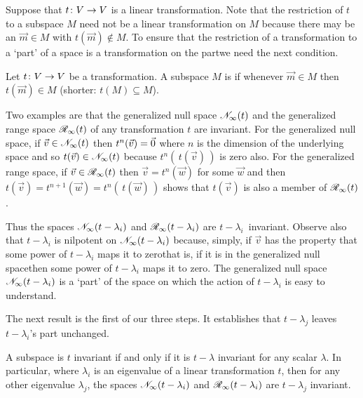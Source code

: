 Suppose that \( \mbox{$t\colon V\to V$} \) is a linear transformation.
Note that the restriction %
of \( t \) to a subspace \( M \) need not be a linear transformation on \( M \)
because there may be an \( \vec{m}\in M \)
with \( t(\vec{m})\not\in M \).
To ensure that the restriction of a transformation 
to a `part' of a space is a transformation on the partwe need the next 
condition. 

\begin{definition} \label{def:invariant}
Let \( \mbox{$t\colon V\to V$} \) be a transformation.
A subspace \( M \) is %
if whenever \( \vec{m}\in M \) then \( t(\vec{m})\in M \)
(shorter: \( t(M)\subseteq M \)).
\end{definition}
 
Two examples are that
the generalized null space $\mathscr{N}_\infty(t)$ and the generalized range space
$\mathscr{R}_\infty(t)$ of any transformation $t$ are invariant.
For the generalized null space, if $\vec{v}\in\mathscr{N}_\infty(t)$ then
$t^n(\vec{v})=\vec{0}$ where $n$ is the dimension of the underlying space
and so $t(\vec{v})\in\mathscr{N}_\infty(t)$ because
$t^n(\,t(\vec{v})\,)$ is zero also.
For the generalized range space, if $\vec{v}\in\mathscr{R}_\infty(t)$ then
$\vec{v}=t^n(\vec{w})$ for some $\vec{w}$ and then 
$t(\vec{v})=t^{n+1}(\vec{w})=t^n(\,t(\vec{w})\,)$ 
shows that $t(\vec{v})$ is also a member of $\mathscr{R}_\infty(t)$.

Thus the spaces $\mathscr{N}_\infty(t-\lambda_i)$ and $\mathscr{R}_\infty(t-\lambda_i)$
are $t-\lambda_i$~invariant.
Observe also that $t-\lambda_i$ is nilpotent on 
$\mathscr{N}_\infty(t-\lambda_i)$ because, simply, 
if $\vec{v}$ has the property that
some power of $t-\lambda_i$ maps it to zero\Dash that is, if it is in the 
generalized null space\Dash then some power of $t-\lambda_i$ maps
it to zero.
The generalized null space $\mathscr{N}_\infty(t-\lambda_i)$ is a `part' of
the space on which the action of $t-\lambda_i$ is easy to understand.

The next result is the first of our three steps.
It establishes that \( t-\lambda_j \) leaves
\( t-\lambda_i \)'s part unchanged.

\begin{lemma} \label{le:tInvIfftMinLambdaInv}
A subspace is \( t \) invariant if and only if 
it is \( t-\lambda \) invariant for any scalar \( \lambda \).
In particular, 
where \( \lambda_i \) is an eigenvalue of  a linear transformation
\( t \), then for any other eigenvalue $\lambda_j$,
the spaces \( \mathscr{N}_\infty(t-\lambda_i) \) 
and \( \mathscr{R}_\infty(t-\lambda_i) \)
are \( t-\lambda_j \) invariant.
\end{lemma}

